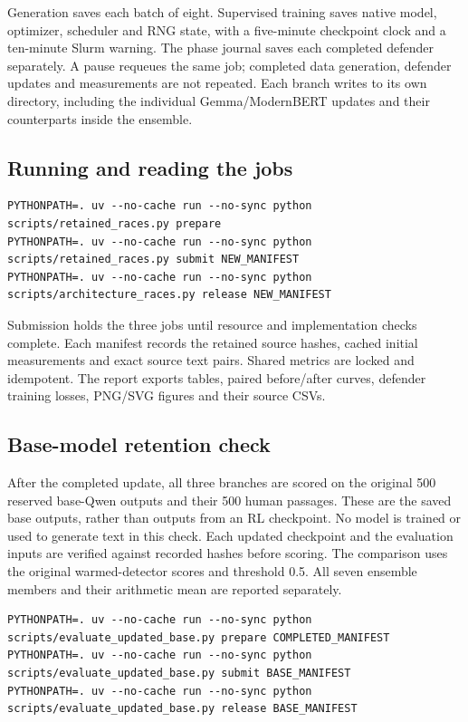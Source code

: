 Generation saves each batch of eight. Supervised training saves native
model, optimizer, scheduler and RNG state, with a five-minute checkpoint
clock and a ten-minute Slurm warning. The phase journal saves each
completed defender separately. A pause requeues the same job; completed
data generation, defender updates and measurements are not repeated.
Each branch writes to its own directory, including the individual
Gemma/ModernBERT updates and their counterparts inside the ensemble.

\subsection{Running and reading the
jobs}\label{record-docs-defender-comparison-md-running-and-reading-the-jobs}

\begin{Verbatim}
PYTHONPATH=. uv --no-cache run --no-sync python scripts/retained_races.py prepare
PYTHONPATH=. uv --no-cache run --no-sync python scripts/retained_races.py submit NEW_MANIFEST
PYTHONPATH=. uv --no-cache run --no-sync python scripts/architecture_races.py release NEW_MANIFEST
\end{Verbatim}

Submission holds the three jobs until resource and implementation checks
complete. Each manifest records the retained source hashes, cached
initial measurements and exact source text pairs. Shared metrics are
locked and idempotent. The report exports tables, paired before/after
curves, defender training losses, PNG/SVG figures and their source CSVs.

\subsection{Base-model retention
check}\label{record-docs-defender-comparison-md-base-model-retention-check}

After the completed update, all three branches are scored on the
original 500 reserved base-Qwen outputs and their 500 human passages.
These are the saved base outputs, rather than outputs from an RL
checkpoint. No model is trained or used to generate text in this check.
Each updated checkpoint and the evaluation inputs are verified against
recorded hashes before scoring. The comparison uses the original
warmed-detector scores and threshold 0.5. All seven ensemble members and
their arithmetic mean are reported separately.

\begin{Verbatim}
PYTHONPATH=. uv --no-cache run --no-sync python scripts/evaluate_updated_base.py prepare COMPLETED_MANIFEST
PYTHONPATH=. uv --no-cache run --no-sync python scripts/evaluate_updated_base.py submit BASE_MANIFEST
PYTHONPATH=. uv --no-cache run --no-sync python scripts/evaluate_updated_base.py release BASE_MANIFEST
\end{Verbatim}

